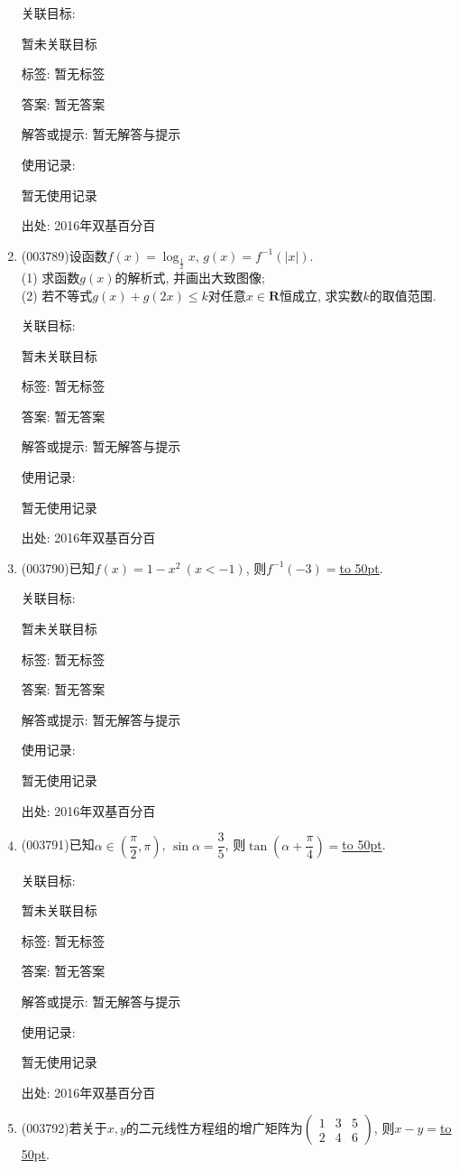 \documentclass[10pt,a4paper]{article}
\newcommand{\blank}[1]{\underline{\hbox to #1pt{}}}
\begin{document}
\begin{enumerate}[1.]
关联目标:

暂未关联目标



标签: 暂无标签

答案: 暂无答案

解答或提示: 暂无解答与提示

使用记录:

暂无使用记录


出处: 2016年双基百分百
\item { (003789)}设函数$f(x)=\log_\frac 12 x$, $g(x)=f^{-1}(|x|)$.\\
(1) 求函数$g(x)$的解析式, 并画出大致图像;\\
(2) 若不等式$g(x)+g(2x)\le k$对任意$x\in \mathbf{R}$恒成立, 求实数$k$的取值范围.


关联目标:

暂未关联目标



标签: 暂无标签

答案: 暂无答案

解答或提示: 暂无解答与提示

使用记录:

暂无使用记录


出处: 2016年双基百分百
\item { (003790)}已知$f(x)=1-x^2 \ (x<-1)$, 则$f^{-1}(-3)=$\blank{50}.


关联目标:

暂未关联目标



标签: 暂无标签

答案: 暂无答案

解答或提示: 暂无解答与提示

使用记录:

暂无使用记录


出处: 2016年双基百分百
\item { (003791)}已知$\alpha\in \left(\dfrac{\pi}{2},\pi\right)$, $\sin\alpha=\dfrac{3}{5}$, 则$\tan\left(\alpha+\dfrac{\pi}{4}\right)=$\blank{50}.


关联目标:

暂未关联目标



标签: 暂无标签

答案: 暂无答案

解答或提示: 暂无解答与提示

使用记录:

暂无使用记录


出处: 2016年双基百分百
\item { (003792)}若关于$x,y$的二元线性方程组的增广矩阵为$\begin{pmatrix}1 & 3 & 5\\2 & 4 & 6\end{pmatrix}$, 则$x-y=$\blank{50}.



\end{enumerate}
\end{document}
